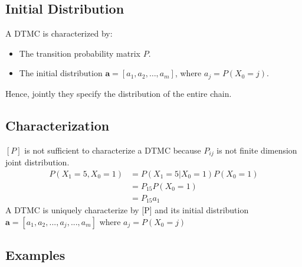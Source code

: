 \documentclass[12pt]{article}
\begin{document}
\subsection*{Initial Distribution}
A DTMC is characterized by:
\begin{itemize}
\item The transition probability matrix $P$.
\item The initial distribution $\bm{a} = [a_1, a_2, \ldots, a_m]$, where $a_j = P(X_0 = j)$. 
\end{itemize}
Hence, jointly they specify the distribution of the entire chain.

\subsection*{Characterization}
$[P]$ is not sufficient to characterize a DTMC because $P_{ij}$ is not finite dimension joint distribution.
\begin{align*}
    P(X_1=5,X_0=1)&=P(X_1=5 | X_0=1)P(X_0=1)\\
    &= P_{15}P(X_0=1)\\
    &= P_{15}a_1
\end{align*}
A DTMC is uniquely characterize by [P] and its initial distribution $\textbf{a} = [a_1,a_2,...,a_j,...,a_m]$ where $a_j = P(X_0=j)$
\subsection*{Examples}
\end{document}
